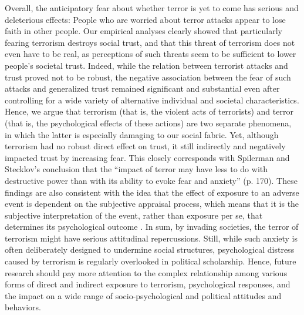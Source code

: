 Overall, the anticipatory fear about whether terror is yet to come has serious and deleterious effects: People who are worried about terror attacks appear to lose faith in other people. Our empirical analyses clearly showed that particularly fearing terrorism destroys social trust, and that this threat of terrorism does not even have to be real, as perceptions of such threats seem to be sufficient to lower people’s societal trust. Indeed, while the relation between terrorist attacks and trust proved not to be robust, the negative association between the fear of such attacks and generalized trust remained significant and substantial even after controlling for a wide variety of alternative individual and societal characteristics. Hence, we argue that terrorism (that is, the violent acts of terrorists) and terror (that is, the psychological effects of these actions) are two separate phenomena, in which the latter is especially damaging to our social fabric. Yet, although terrorism had no robust direct effect on trust, it still indirectly and negatively impacted trust by increasing fear. This closely corresponds with Spilerman and Stecklov’s \citeyear{Spilerman2009} conclusion that the ``impact of terror may have less to do with destructive power than with its ability to evoke fear and anxiety'' (p. 170). These findings are also consistent with the idea that the effect of exposure to an adverse event is dependent on the subjective appraisal process, which means that it is the subjective interpretation of the event, rather than exposure per se, that determines its psychological outcome \citep{Folkman1986, Lazarus1987}. In sum, by invading societies, the terror of terrorism might have serious attitudinal repercussions. Still, while such anxiety is often deliberately designed to undermine social structures, psychological distress caused by terrorism is regularly overlooked in political scholarship. Hence, future research should pay more attention to the complex relationship among various forms of direct and indirect exposure to terrorism, psychological responses, and the impact on a wide range of socio-psychological and political attitudes and behaviors.


